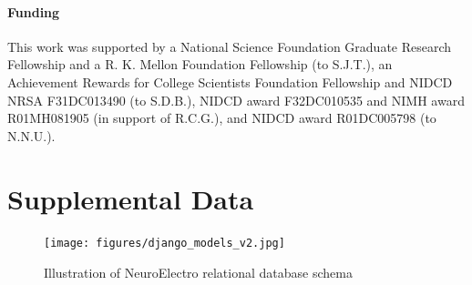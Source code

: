 \documentclass{template/frontiersSCNS} %
\begin{document}
\paragraph{Funding\textcolon} This work was supported by a National Science Foundation Graduate Research Fellowship and a R. K. Mellon Foundation Fellowship (to S.J.T.), an Achievement Rewards for College Scientists Foundation Fellowship and NIDCD NRSA F31DC013490 (to S.D.B.), NIDCD award F32DC010535 and NIMH award R01MH081905 (in support of R.C.G.), and NIDCD award R01DC005798 (to N.N.U.).



\section*{Supplemental Data}
\begin{figure}[htbp]
\centering
\texttt{[image: figures/django\_models\_v2.jpg]}
\caption{Illustration of NeuroElectro relational database schema}
\label{db_schema}
\end{figure}
\end{document}
